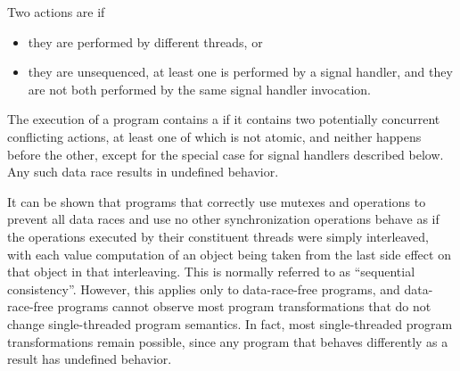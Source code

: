 \pnum
Two actions are  if
\begin{itemize}
\item they are performed by different threads, or
\item they are unsequenced, at least one is performed by a signal handler, and
they are not both performed by the same signal handler invocation.
\end{itemize}
The execution of a program contains a  if it contains two
potentially concurrent conflicting actions, at least one of which is not atomic,
and neither happens before the other,
except for the special case for signal handlers described below.
Any such data race results in undefined
behavior.
%
%
%
%
%
\begin{note}
It can be shown that programs that correctly use mutexes
and  operations to prevent all data races and use no
other synchronization operations behave as if the operations executed by their
constituent threads were simply interleaved, with each
%
value computation of an
object being taken from the last
%
side effect on that object in that
interleaving. This is normally referred to as ``sequential consistency''.
However, this applies only to data-race-free programs, and data-race-free
programs cannot observe most program transformations that do not change
single-threaded program semantics. In fact, most single-threaded program
transformations remain possible, since any program that behaves
differently as a result has undefined behavior.
\end{note}

